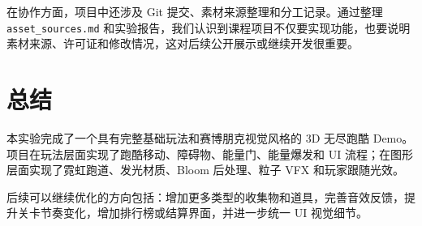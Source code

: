 \documentclass[UTF8,a4paper,12pt]{ctexart}
\begin{document}
在协作方面，项目中还涉及 Git 提交、素材来源整理和分工记录。通过整理 \texttt{asset\_sources.md} 和实验报告，我们认识到课程项目不仅要实现功能，也要说明素材来源、许可证和修改情况，这对后续公开展示或继续开发很重要。

\section{总结}

本实验完成了一个具有完整基础玩法和赛博朋克视觉风格的 3D 无尽跑酷 Demo。项目在玩法层面实现了跑酷移动、障碍物、能量门、能量爆发和 UI 流程；在图形层面实现了霓虹跑道、发光材质、Bloom 后处理、粒子 VFX 和玩家跟随光效。

后续可以继续优化的方向包括：增加更多类型的收集物和道具，完善音效反馈，提升关卡节奏变化，增加排行榜或结算界面，并进一步统一 UI 视觉细节。
\end{document}
